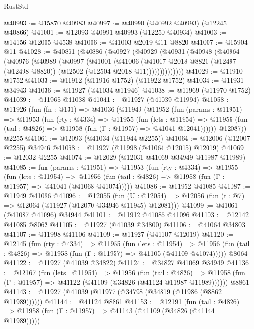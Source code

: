 \begin{lexlean}{RustStd}
\begin{coremodule}
@40993 := @15870 @40983
@40997 := @40990 (@40992 @40993) (@12245 @40866)
@41001 := @12093 @40991 @40993 (@12250 @40934)
@41003 := @14156 @12005 @4538
@41006 := @41003 @2019 @11 @8820
@41007 := @15904 @11
@41028 := @40861
    (@40886
      (@40927
        (@40929
          (@40931
            (@40948
              (@40964
                (@40976
                  (@40989
                    (@40997
                      (@41001
                        (@41006
                          (@41007
                            @2018
                            @8820
                            (@12497 (@12498 @8820))
                            (@12502 (@12504 @2018 @11))))))))))))))
@41029 := @11910 @1752
@41033 := @11912 (@11916 @1752) (@11922 @1752)
@41034 := @11931 @34943
@41036 := @11927 (@41034 @11946)
@41038 := @11969 (@11970 @1752)
@41039 := @11965 @41038
@41041 := @11927 (@41039 @11994)
@41058 := @11926
    (fun (fn : @131) =>
    @41036
      (@11949
        (@11952
          (fun (params : @11951) =>
          @11953
            (fun (rty : @4334) =>
            @11955
              (fun (lets : @11954) =>
              @11956 (fun (tail : @4826) => @11958 (fun (Γ : @11957) => @41041 @12041))))))
        @12087))
    @2255
@41061 := @12093 (@41034 (@11944 @2255))
@41064 := @12006 (@12007 @2255) @34946
@41068 := @11927 (@11998 (@41064 @12015) @12019)
@41069 := @12032 @2255
@41074 := @12029 (@12031 @41069 @34949 @11987 @11989)
@41085 := fun (params : @11951) =>
  @11953
    (fun (rty : @4334) =>
    @11955
      (fun (lets : @11954) =>
      @11956 (fun (tail : @4826) => @11958 (fun (Γ : @11957) => @41041 (@41068 @41074)))))
@41086 := @11952 @41085
@41087 := @11949 @41086
@41096 := @12055
    (fun (U : @12054) => @12056 (fun (t : @7) => @12064 (@11927 (@12070 @34946 @11945) @12081)))
@41099 := @41061 (@41087 @41096) @34944
@41101 := @11912 @41086 @41096
@41103 := @12142 @41085 @8062
@41105 := @11927 (@41039 @34800)
@41106 := @41064 @34803
@41107 := @11998 @41106
@41109 := @11927 (@41107 @12019)
@41120 := @12145
    (fun (rty : @4334) =>
    @11955
      (fun (lets : @11954) =>
      @11956 (fun (tail : @4826) => @11958 (fun (Γ : @11957) => @41105 (@41109 @41074)))))
    @8064
@41122 := @11927 (@41039 @34822)
@41124 := @34827 @41069 @34949
@41136 := @12167
    (fun (lets : @11954) =>
    @11956
      (fun (tail : @4826) =>
      @11958 (fun (Γ : @11957) => @41122 (@41109 (@34826 (@41124 @11987 @11989))))))
    @8861
@41143 := @11927 (@41039 (@11977 (@34798 (@34819 (@11986 (@8862 @11989))))))
@41144 := @41124 @8861
@41153 := @12191
    (fun (tail : @4826) => @11958 (fun (Γ : @11957) => @41143 (@41109 (@34826 (@41144 @11989)))))

\end{coremodule}
\end{lexlean}
